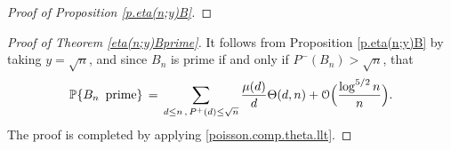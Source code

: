 \documentclass[11pt,draft,reqno]{amsart}
\theoremstyle{definition}
\theoremstyle{remarks}
\numberwithin{equation}{section}
\def \m{{\mu}}
\def \qq{{\qquad}}
\def\P{{\mathcal P}}
\def\P{{\mathbb P}}
\def\Z{{\mathbb Z}}
\begin{document}
\begin{proof}[Proof of Proposition \ref{p.eta(n;y)B}]
 

\end{proof}


\begin{proof}[Proof of Theorem \ref{eta(n;y)Bprime}]It follows from Proposition \ref{p.eta(n;y)B} by taking $y=\sqrt n$, and  since $B_n$ is prime  if and only if $P^-(B_n )> \sqrt n$, that 
\begin{equation*}
\P\{ B_n\,\hbox{  prime} \} \,=\,  \sum_{ d\le n\,,\, P^+(d )\le \sqrt n}{  \m(d)\over d}\Theta(d,n)+ {\mathcal O}\Big( {  \log^{5/2} n  \over n }  
 \Big).
\end{equation*} 
   The proof is completed by  applying \eqref{poisson.comp.theta.llt}.
\end{proof}
 
\end{document}

